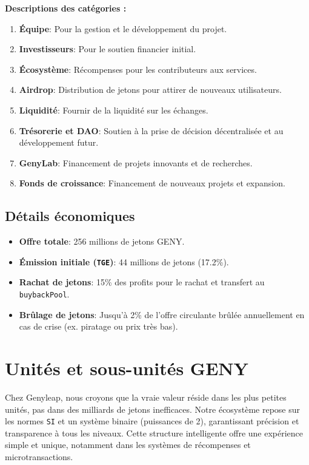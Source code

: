 \documentclass[a4paper,12pt,openany]{book}
\begin{document}
\textbf{Descriptions des catégories :}
\begin{enumerate}
    \item \textbf{Équipe}: Pour la gestion et le développement du projet.
    \item \textbf{Investisseurs}: Pour le soutien financier initial.
    \item \textbf{Écosystème}: Récompenses pour les contributeurs aux services.
    \item \textbf{Airdrop}: Distribution de jetons pour attirer de nouveaux utilisateurs.
    \item \textbf{Liquidité}: Fournir de la liquidité sur les échanges.
    \item \textbf{Trésorerie et DAO}: Soutien à la prise de décision décentralisée et au développement futur.
    \item \textbf{GenyLab}: Financement de projets innovants et de recherches.
    \item \textbf{Fonds de croissance}: Financement de nouveaux projets et expansion.
\end{enumerate}

\subsection*{Détails économiques}
\begin{itemize}
    \item \textbf{Offre totale}: 256 millions de jetons GENY.
    \item \textbf{Émission initiale (\texttt{TGE})}: 44 millions de jetons (17.2\%).
    \item \textbf{Rachat de jetons}: 15\% des profits pour le rachat et transfert au \texttt{buybackPool}.
    \item \textbf{Brûlage de jetons}: Jusqu'à 2\% de l'offre circulante brûlée annuellement en cas de crise (ex. piratage ou prix très bas).
\end{itemize}
\newpage

\section*{Unités et sous-unités GENY}
Chez Genyleap, nous croyons que la vraie valeur réside dans les plus petites unités, pas dans des milliards de jetons inefficaces. Notre écosystème repose sur les normes \texttt{SI} et un système binaire (puissances de 2), garantissant précision et transparence à tous les niveaux. Cette structure intelligente offre une expérience simple et unique, notamment dans les systèmes de récompenses et microtransactions.
\end{document}
